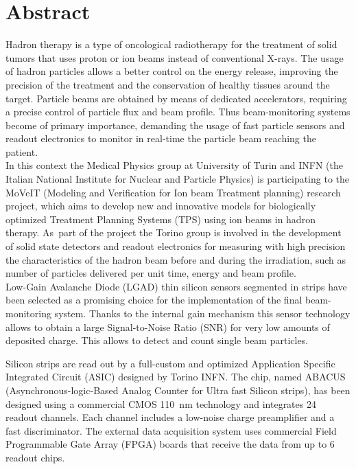 
\chapter*{Abstract}
\thispagestyle{plain}
Hadron therapy is a type of oncological radiotherapy for the treatment of solid tumors that uses proton or
ion beams instead of conventional X-rays. The usage of hadron particles allows a better control on the energy release,
improving the precision of the treatment and the conservation of healthy tissues around the target.
Particle beams are obtained by means of dedicated accelerators, requiring a precise control of particle flux and beam profile.
Thus beam-monitoring systems become of primary importance, demanding the usage of fast particle sensors and readout electronics to monitor
in real-time the particle beam reaching the patient.\\

In this context the Medical Physics group at University of Turin and INFN (the Italian National Institute for
Nuclear and Particle Physics) is participating to the MoVeIT (Modeling and Verification for Ion beam Treatment planning) research project, which aims to develop new and
innovative models for biologically optimized Treatment Planning Systems (TPS) using ion beams in hadron therapy.
As~part of the project the Torino group is involved in the development of solid state detectors and readout electronics for measuring with high precision
the characteristics of the hadron beam before and during the irradiation, such as number of particles delivered per unit time, energy and beam profile.\\

Low-Gain Avalanche Diode (LGAD) thin silicon sensors segmented in strips have been selected as a promising choice for the implementation
of the final beam-monitoring system. Thanks to the internal gain mechanism this sensor technology allows to obtain a large
Signal-to-Noise Ratio (SNR) for very low amounts of deposited charge. This allows to detect and count single beam particles.

\noindent Silicon strips are read out by a full-custom and optimized Application Specific Integrated Circuit (ASIC) designed by Torino INFN.
The chip, named ABACUS (Asynchronous-logic-Based Analog Counter for Ultra fast Silicon strips), has been 
designed using a commercial CMOS 110~nm technology and integrates 24 readout channels. Each channel includes a low-noise charge preamplifier 
and a fast discriminator. The external data acquisition system uses commercial Field Programmable Gate Array (FPGA) boards that receive
the data from up to 6 readout chips.\\%

